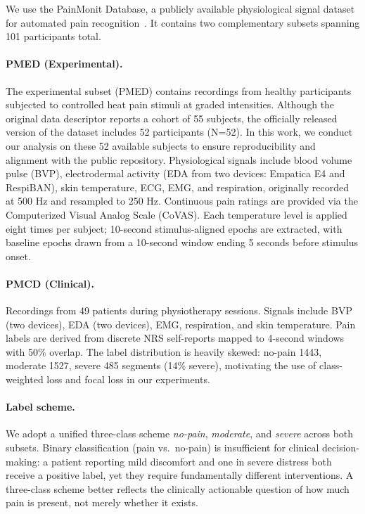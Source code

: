 \documentclass{article}
\begin{document}
We use the PainMonit Database, a publicly available physiological signal dataset for automated pain recognition~\citep{gouverneur2024painmonit}. It contains two complementary subsets spanning 101 participants total.

\paragraph{PMED (Experimental).} The experimental subset (PMED) contains recordings from healthy participants subjected to controlled heat pain stimuli at graded intensities. Although the original data descriptor \citet{gouverneur2024painmonit} reports a cohort of 55 subjects, the officially released version of the dataset includes 52 participants (N=52). In this work, we conduct our analysis on these 52 available subjects to ensure reproducibility and alignment with the public repository. Physiological signals include blood volume pulse (BVP), electrodermal activity (EDA from two devices: Empatica E4 and RespiBAN), skin temperature, ECG, EMG, and respiration, originally recorded at 500 Hz and resampled to 250 Hz. Continuous pain ratings are provided via the Computerized Visual Analog Scale (CoVAS). Each temperature level is applied eight times per subject; 10-second stimulus-aligned epochs are extracted, with baseline epochs drawn from a 10-second window ending 5 seconds before stimulus onset.

\paragraph{PMCD (Clinical).} Recordings from 49 patients during physiotherapy sessions. Signals include BVP (two devices), EDA (two devices), EMG, respiration, and skin temperature. Pain labels are derived from discrete NRS self-reports mapped to 4-second windows with 50\% overlap. The label distribution is heavily skewed: no-pain 1443, moderate 1527, severe 485 segments (14\% severe), motivating the use of class-weighted loss and focal loss in our experiments.

\paragraph{Label scheme.}
We adopt a unified three-class scheme \emph{no-pain}, \emph{moderate}, and \emph{severe} across both subsets. Binary classification (pain vs.\ no-pain) is insufficient for clinical decision-making: a patient reporting mild discomfort and one in severe distress both receive a positive label, yet they require fundamentally different interventions. A three-class scheme better reflects the clinically actionable question of how much pain is present, not merely whether it exists.
\end{document}
